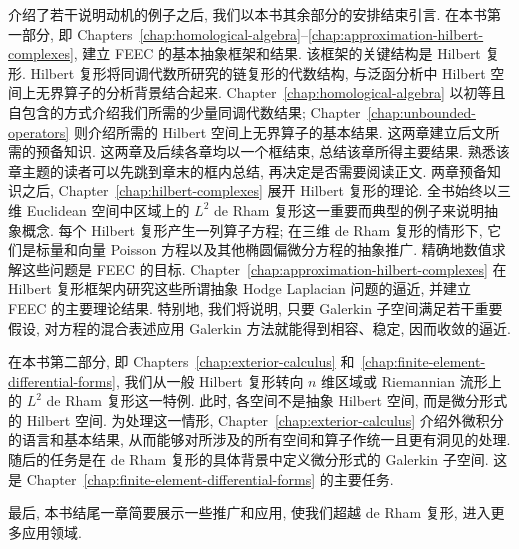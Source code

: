 介绍了若干说明动机的例子之后, 我们以本书其余部分的安排结束引言. 在本书第一部分, 即 Chapters~\ref{chap:homological-algebra}--\ref{chap:approximation-hilbert-complexes}, 建立 FEEC 的基本抽象框架和结果. 该框架的关键结构是 Hilbert 复形. Hilbert 复形将同调代数所研究的链复形的代数结构, 与泛函分析中 Hilbert 空间上无界算子的分析背景结合起来. Chapter~\ref{chap:homological-algebra} 以初等且自包含的方式介绍我们所需的少量同调代数结果; Chapter~\ref{chap:unbounded-operators} 则介绍所需的 Hilbert 空间上无界算子的基本结果. 这两章建立后文所需的预备知识. 这两章及后续各章均以一个框结束, 总结该章所得主要结果. 熟悉该章主题的读者可以先跳到章末的框内总结, 再决定是否需要阅读正文. 两章预备知识之后, Chapter~\ref{chap:hilbert-complexes} 展开 Hilbert 复形的理论. 全书始终以三维 Euclidean 空间中区域上的 $L^2$ de Rham 复形这一重要而典型的例子来说明抽象概念. 每个 Hilbert 复形产生一列算子方程; 在三维 de Rham 复形的情形下, 它们是标量和向量 Poisson 方程以及其他椭圆偏微分方程的抽象推广. 精确地数值求解这些问题是 FEEC 的目标. Chapter~\ref{chap:approximation-hilbert-complexes} 在 Hilbert 复形框架内研究这些所谓抽象 Hodge Laplacian 问题的逼近, 并建立 FEEC 的主要理论结果. 特别地, 我们将说明, 只要 Galerkin 子空间满足若干重要假设, 对方程的混合表述应用 Galerkin 方法就能得到相容、稳定, 因而收敛的逼近.

在本书第二部分, 即 Chapters~\ref{chap:exterior-calculus} 和~\ref{chap:finite-element-differential-forms}, 我们从一般 Hilbert 复形转向 $n$ 维区域或 Riemannian 流形上的 $L^2$ de Rham 复形这一特例. 此时, 各空间不是抽象 Hilbert 空间, 而是微分形式的 Hilbert 空间. 为处理这一情形, Chapter~\ref{chap:exterior-calculus} 介绍外微积分的语言和基本结果, 从而能够对所涉及的所有空间和算子作统一且更有洞见的处理. 随后的任务是在 de Rham 复形的具体背景中定义微分形式的 Galerkin 子空间. 这是 Chapter~\ref{chap:finite-element-differential-forms} 的主要任务.

最后, 本书结尾一章简要展示一些推广和应用, 使我们超越 de Rham 复形, 进入更多应用领域.
